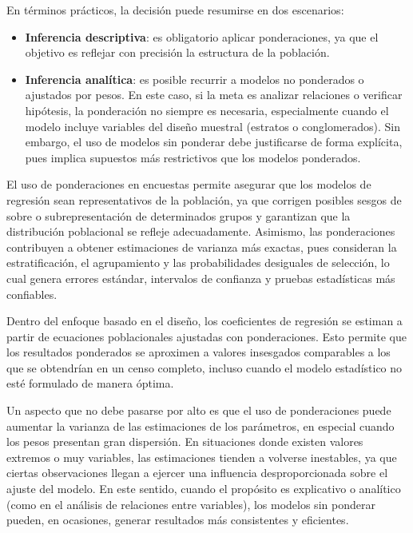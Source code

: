 \documentclass[
  spanish,
  12pt,
]{book}
\begin{document}
En términos prácticos, la decisión puede resumirse en dos escenarios:

\begin{itemize}
\item
  \textbf{Inferencia descriptiva}: es obligatorio aplicar ponderaciones, ya que el objetivo es reflejar con precisión la estructura de la población.
\item
  \textbf{Inferencia analítica}: es posible recurrir a modelos no ponderados o ajustados por pesos. En este caso, si la meta es analizar relaciones o verificar hipótesis, la ponderación no siempre es necesaria, especialmente cuando el modelo incluye variables del diseño muestral (estratos o conglomerados). Sin embargo, el uso de modelos sin ponderar debe justificarse de forma explícita, pues implica supuestos más restrictivos que los modelos ponderados.
\end{itemize}

El uso de ponderaciones en encuestas permite asegurar que los modelos de regresión sean representativos de la población, ya que corrigen posibles sesgos de sobre o subrepresentación de determinados grupos y garantizan que la distribución poblacional se refleje adecuadamente. Asimismo, las ponderaciones contribuyen a obtener estimaciones de varianza más exactas, pues consideran la estratificación, el agrupamiento y las probabilidades desiguales de selección, lo cual genera errores estándar, intervalos de confianza y pruebas estadísticas más confiables.

Dentro del enfoque basado en el diseño, los coeficientes de regresión se estiman a partir de ecuaciones poblacionales ajustadas con ponderaciones. Esto permite que los resultados ponderados se aproximen a valores insesgados comparables a los que se obtendrían en un censo completo, incluso cuando el modelo estadístico no esté formulado de manera óptima.

Un aspecto que no debe pasarse por alto es que el uso de ponderaciones puede aumentar la varianza de las estimaciones de los parámetros, en especial cuando los pesos presentan gran dispersión. En situaciones donde existen valores extremos o muy variables, las estimaciones tienden a volverse inestables, ya que ciertas observaciones llegan a ejercer una influencia desproporcionada sobre el ajuste del modelo. En este sentido, cuando el propósito es explicativo o analítico (como en el análisis de relaciones entre variables), los modelos sin ponderar pueden, en ocasiones, generar resultados más consistentes y eficientes.
\end{document}
